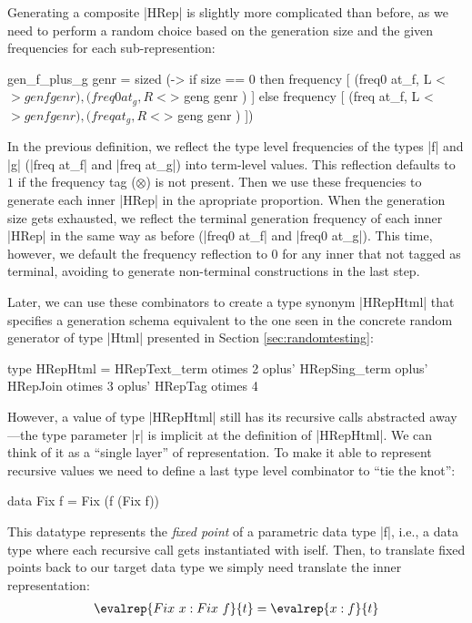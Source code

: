 Generating a composite |HRep| is slightly more complicated than before, as we
need to perform a random choice based on the generation size and the given
frequencies for each sub-represention:

\begin{code}
  gen_f_plus_g genr  = sized (\size ->
    if size == 0
    then frequency
      [ (freq0  at_f,  L  <$> genf  genr  )
      , (freq0  at_g,  R  <$> geng  genr  ) ]
    else frequency
      [ (freq   at_f,  L  <$> genf  genr  )
      , (freq   at_g,  R  <$> geng  genr  ) ])
\end{code} %

In the previous definition, we reflect the type level frequencies of the types
|f| and |g| (|freq at_f| and |freq at_g|) into term-level values.
%
This reflection defaults to $1$ if the frequency tag ($\otimes$) is not present.
%
Then we use these frequencies to generate each inner |HRep| in the apropriate
proportion.
%
When the generation size gets exhausted, we reflect the terminal generation
frequency of each inner |HRep| in the same way as before (|freq0 at_f| and
|freq0 at_g|).
%
This time, however, we default the frequency reflection to $0$ for any inner
that not tagged as terminal, avoiding to generate non-terminal constructions in
the last step.


Later, we can use these combinators to create a type synonym |HRepHtml| that
specifies a generation schema equivalent to the one seen in the concrete random
generator of type |Html| presented in Section \ref{sec:randomtesting}:

\begin{code}
type HRepHtml  =       HRepText_term  otimes 2
               oplus'  HRepSing_term
               oplus'  HRepJoin       otimes 3
               oplus'  HRepTag        otimes 4
\end{code}

However, a value of type |HRepHtml| still has its recursive calls abstracted
away---the type parameter |r| is implicit at the definition of |HRepHtml|.
%
We can think of it as a ``single layer'' of representation.
%
To make it able to represent recursive values we need to define a last type
level combinator to ``tie the knot'':

\begin{code}
  data Fix f = Fix (f (Fix f))
\end{code}

This datatype represents the \emph{fixed point} of a parametric data type |f|,
i.e., a data type where each recursive call gets instantiated with iself.
%
Then, to translate fixed points back to our target data type we simply need
translate the inner representation:
%
\begin{align*}
  \evalrep{Fix\ x : Fix\ f}{t} = \evalrep{x : f}{t}
\end{align*}

